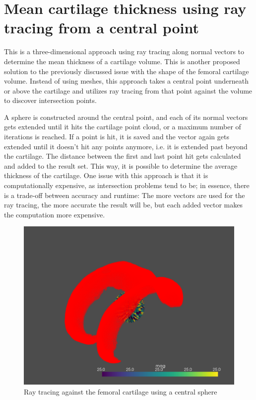 \section{Mean cartilage thickness using ray tracing from a central point}
This is a three-dimensional approach using ray tracing along normal vectors to determine the mean thickness of a cartilage volume. This is another proposed solution to the previously discussed issue with the shape of the femoral cartilage volume. Instead of using meshes, this approach takes a central point underneath or above the cartilage and utilizes ray tracing from that point against the volume to discover intersection points. 
\par
A sphere is constructed around the central point, and each of its normal vectors gets extended until it hits the cartilage point cloud, or a maximum number of iterations is reached. If a point is hit, it is saved and the vector again gets extended until it doesn't hit any points anymore, i.e. it is extended past beyond the cartilage. The distance between the first and last point hit gets calculated and added to the result set. This way, it is possible to determine the average thickness of the cartilage. One issue with this approach is that it is computationally expensive, as intersection problems tend to be; in essence, there is a trade-off between accuracy and runtime: The more vectors are used for the ray tracing, the more accurate the result will be, but each added vector makes the computation more expensive.
\begin{figure}[htb!]
	\centering
	\includegraphics[width=\linewidth]{./figures/s5}
	\caption{Ray tracing against the femoral cartilage using a central sphere}
	\label{fig:femoral_sphere}
\end{figure}

